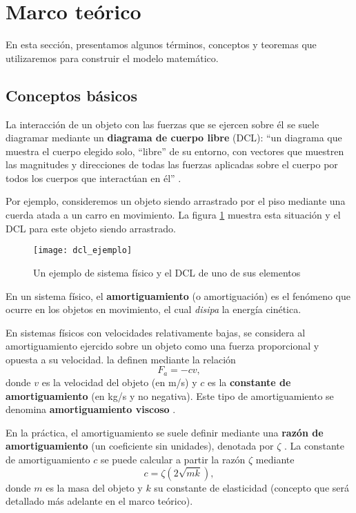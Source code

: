 \section{Marco teórico}

En esta sección, presentamos algunos términos, conceptos y teoremas que utilizaremos para construir el modelo matemático.

\subsection{Conceptos básicos}

La interacción de un objeto con las fuerzas que se ejercen sobre él se suele diagramar mediante un \textbf{diagrama de cuerpo libre} (DCL): ``un diagrama que muestra el cuerpo elegido solo, ``libre'' de su entorno, con vectores que muestren las magnitudes y direcciones de todas las fuerzas aplicadas sobre el cuerpo por todos los cuerpos que interactúan en él'' \citep{young}.

Por ejemplo, consideremos un objeto siendo arrastrado por el piso mediante una cuerda atada a un carro en movimiento. La figura \ref{fig:dcl-ejemplo} muestra esta situación y el DCL para este objeto siendo arrastrado.

\begin{figure}[ht!]
    \centering
    \texttt{[image: dcl\_ejemplo]}
    \caption{Un ejemplo de sistema físico y el DCL de uno de sus elementos}
    \label{fig:dcl-ejemplo}
\end{figure}

\begin{definition}[amortiguamiento]
    En un sistema físico, el \textbf{amortiguamiento} (o amortiguación) es el fenómeno que ocurre en los objetos en movimiento, el cual \textit{disipa} la energía cinética.
\end{definition}

En sistemas físicos con velocidades relativamente bajas, se considera al amortiguamiento ejercido sobre un objeto como una fuerza proporcional y opuesta a su velocidad. \citet{rak} la definen mediante la relación
\[
    F_a = -cv
,\]
donde \(v\) es la velocidad del objeto (en \si{m/s}) y \(c\) es la \textbf{constante de amortiguamiento} (en \si{kg/s} y no negativa). Este tipo de amortiguamiento se denomina \textbf{amortiguamiento viscoso} \citep{rak}.

En la práctica, el amortiguamiento se suele definir mediante una \textbf{razón de amortiguamiento} (un coeficiente sin unidades), denotada por \(\zeta\) \citep{tarque}. La constante de amortiguamiento \(c\) se puede calcular a partir la razón \(\zeta\) mediante
\[
    c = \zeta \left( 2\sqrt{mk} \right)
,\]
donde \(m\) es la masa del objeto y \(k\) su constante de elasticidad (concepto que será detallado más adelante en el marco teórico).

